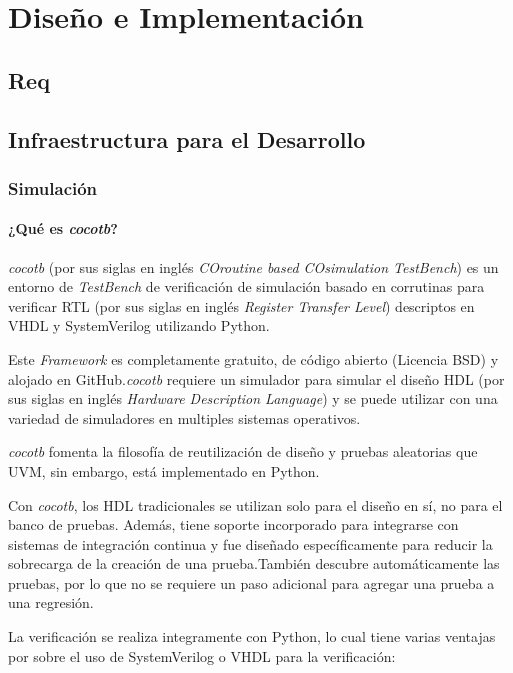 \chapter{Diseño e Implementación}
\label{Chapter3}

\section{Req}

% 

\section{Infraestructura para el Desarrollo}

\subsection{Simulación}

\subsubsection{¿Qué es \textit{cocotb}?}
\textit{cocotb} (por sus siglas en inglés \textit{COroutine based COsimulation TestBench}) es
un entorno de \textit{TestBench} de verificación de simulación basado en
corrutinas para verificar RTL (por sus siglas en inglés \textit{Register Transfer Level})
descriptos en VHDL y SystemVerilog utilizando Python.

Este \textit{Framework} es completamente gratuito, de código abierto (Licencia
BSD) y alojado en GitHub.\textit{cocotb} requiere un simulador para simular el
diseño HDL (por sus siglas en inglés \textit{Hardware Description Language}) y se puede
utilizar con una variedad de simuladores en multiples sistemas operativos.

\textit{cocotb} fomenta la filosofía de reutilización de diseño y pruebas
aleatorias que UVM, sin embargo, está implementado en Python.

Con \textit{cocotb}, los HDL tradicionales se utilizan solo para el diseño en
sí, no para el banco de pruebas. Además, tiene soporte incorporado para
integrarse con sistemas de integración continua y fue diseñado específicamente
para reducir la sobrecarga de la creación de una prueba.También descubre
automáticamente las pruebas, por lo que no se requiere un paso adicional para
agregar una prueba a una regresión.

La verificación se realiza integramente con Python, lo cual tiene varias
ventajas por sobre el uso de SystemVerilog o VHDL para la verificación:

